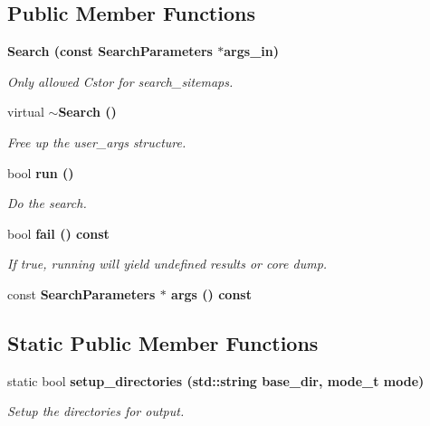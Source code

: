 \subsection*{Public Member Functions}
\begin{CompactItemize}
\item 
\bf{Search} (const \bf{Search\-Parameters} $\ast$args\_\-in)\label{classASCbase_1_1Search_ff7b007d7a7b19f5009d205ec68ce465}

\begin{CompactList}\small\item\em Only allowed Cstor for search\_\-sitemaps. \item\end{CompactList}\item 
virtual \bf{$\sim$Search} ()\label{classASCbase_1_1Search_4cdd25e61eac9ffe50b2aaa79a8a728b}

\begin{CompactList}\small\item\em Free up the user\_\-args structure. \item\end{CompactList}\item 
bool \bf{run} ()
\begin{CompactList}\small\item\em Do the search. \item\end{CompactList}\item 
bool \bf{fail} () const 
\begin{CompactList}\small\item\em If true, running will yield undefined results or core dump. \item\end{CompactList}\item 
const \bf{Search\-Parameters} $\ast$ \textbf{args} () const \label{classASCbase_1_1Search_ed92b23eb8bdd71f0ba4efcde810c99b}

\end{CompactItemize}
\subsection*{Static Public Member Functions}
\begin{CompactItemize}
\item 
static bool \bf{setup\_\-directories} (std::string base\_\-dir, mode\_\-t mode)\label{classASCbase_1_1Search_04389ee319e0961afe77b5c5f4f93a70}

\begin{CompactList}\small\item\em Setup the directories for output. \item\end{CompactList}\end{CompactItemize}
